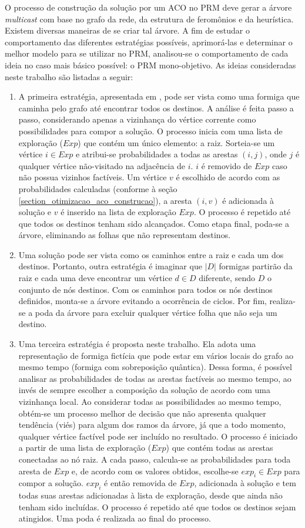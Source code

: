 O processo de construção da solução por um ACO no PRM deve gerar a árvore \textit{multicast} com base no grafo da rede, da estrutura de feromônios e da heurística. Existem diversas maneiras de se criar tal árvore. A fim de estudar o comportamento das diferentes estratégias possíveis, aprimorá-las e determinar o melhor modelo para se utilizar no PRM, analisou-se o comportamento de cada ideia no caso mais básico possível: o PRM mono-objetivo. As ideias consideradas neste trabalho são listadas a seguir:

\begin{enumerate}
	\item A primeira estratégia, apresentada em \cite{Pinto2005}, pode ser vista como uma formiga que caminha pelo grafo até encontrar todos os destinos. A análise é feita passo a passo, considerando apenas a vizinhança do vértice corrente como possibilidades para compor a solução. O processo inicia com uma lista de exploração ($Exp$) que contém um único elemento: a raiz. Sorteia-se um vértice $i \in Exp$ e atribui-se probabilidades a todas as arestas $(i, j)$, onde $j$ é qualquer vértice não-visitado na adjacência de $i$. $i$ é removido de $Exp$ caso não possua vizinhos factíveis. Um vértice $v$ é escolhido de acordo com as probabilidades calculadas (conforme à seção \ref{section_otimizacao_aco_construcao}), a aresta $(i, v)$ é adicionada à solução e $v$ é inserido na lista de exploração $Exp$. O processo é repetido até que todos os destinos tenham sido alcançados. Como etapa final, poda-se a árvore, eliminando as folhas que não representam destinos.
	\item Uma solução pode ser vista como os caminhos entre a raiz e cada um dos destinos. Portanto, outra estratégia é imaginar que $|D|$ formigas partirão da raiz e cada uma deve encontrar um vértice $d \in D$ diferente, sendo $D$ o conjunto de nós destinos. Com os caminhos para todos os nós destinos definidos, monta-se a árvore evitando a ocorrência de ciclos. Por fim, realiza-se a poda da árvore para excluir qualquer vértice folha que não seja um destino. %
	\item Uma terceira estratégia é proposta neste trabalho. Ela adota uma representação de formiga fictícia que pode estar em vários locais do grafo ao mesmo tempo (formiga com sobreposição quântica). Dessa forma, é possível analisar as probabilidades de todas as arestas factíveis ao mesmo tempo, ao invés de sempre escolher a composição da solução de acordo com uma vizinhança local. Ao considerar todas as possibilidades ao mesmo tempo, obtém-se um processo melhor de decisão que não apresenta qualquer tendência (viés) para algum dos ramos da árvore, já que a todo momento, qualquer vértice factível pode ser incluído no resultado. O processo é iniciado a partir de uma lista de exploração ($Exp$) que contém todas as arestas conectadas ao nó raiz. A cada passo, calcula-se as probabilidades para toda aresta de $Exp$ e, de acordo com os valores obtidos, escolhe-se $exp_i \in Exp$ para compor a solução. $exp_i$ é então removida de $Exp$, adicionada à solução e tem todas suas arestas adicionadas à lista de exploração, desde que ainda não tenham sido incluídas. O processo é repetido até que todos os destinos sejam atingidos. Uma poda é realizada ao final do processo.

\end{enumerate}

